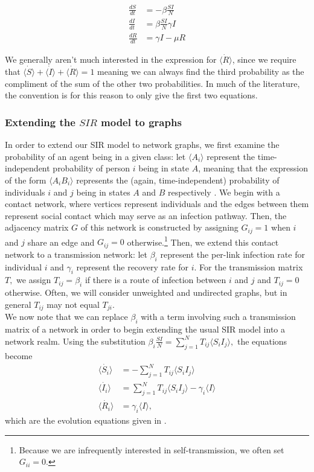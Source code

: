 \documentclass[../report.tex]{subfiles}
\begin{document}
\begin{align}
\frac{dS}{dt} & = -\beta \frac{SI}{N} \label{dS}\\
\frac{dI}{dt} & = \beta\frac{SI}{N} \gamma I \label{dI}\\
\frac{dR}{dt} & = \gamma I - \mu R \label{dR}
\end{align}

We generally aren't much interested in the expression for $\dot{\langle R \rangle}$, since we require that $ \dot{\langle S \rangle} + \dot{\langle I \rangle} + \dot{\langle R \rangle} = 1$ meaning we can always find the third probability as the compliment of the sum of the other two probabilities. In much of the literature, the convention is for this reason to only give the first two equations.

\subsubsection{Extending the $SIR$ model to graphs}

In order to extend our SIR model to network graphs, we first examine the probability of an agent being in a given class: let $\langle A_i \rangle$ represent the time-independent probability of person $i$ being in state $A$, meaning that the expression of the form $\langle A_i B_i \rangle$ represents the (again, time-independent) probability of individuals $i$ and $j$ being in states $A$ and $B$ respectively \cite{kiss_2014}. We begin with a contact network, where vertices represent individuals and the edges between them represent social contact which may serve as an infection pathway. Then, the adjacency matrix $G$ of this network is constructed by assigning $G_{ij} = 1$ when $i$ and $j$ share an edge and $G_{ij} = 0$ otherwise.\footnote{Because we are infrequently interested in self-transmission, we often set $G_{ii}=0.$} Then, we extend this contact network to a transmission network: let $\beta_i$ represent the per-link infection rate for individual $i$ and $\gamma_i$ represent the recovery rate for $i$. For the transmission matrix $T,$ we assign $T_{ij}=\beta_i$ if there is a route of infection between $i$ and $j$ and $T_{ij}=0$ otherwise. Often, we will consider unweighted and undirected graphs, but in general $T_{ij}$ may not equal $T_{ji}$.\\
We now note that we can replace $\beta_i$ with a term involving such a transmission matrix of a network in order to begin extending the usual SIR model into a network realm. Using the substitution $ \beta_i \frac{SI}{N} = \sum^{N}_{j=1}T_{ij} \langle S_i I_j \rangle,$ the equations become
\begin{align*}
\dot{\langle S_i \rangle} & = -\sum^{N}_{j=1}T_{ij} \langle S_i I_j \rangle\\
\dot{\langle I_i \rangle} & =\sum^{N}_{j=1}T_{ij}\langle S_i I_j \rangle - \gamma_i \langle I \rangle \\
\dot{\langle R_i \rangle} & = \gamma_i \langle I \rangle,
\end{align*}
which are the evolution equations given in \cite{kiss_2014}.
\end{document}
